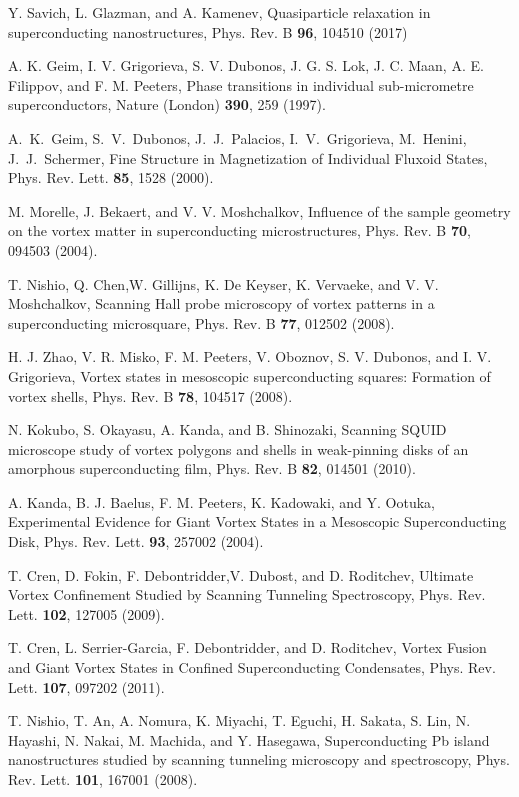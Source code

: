 \documentclass[prx,twocolumn,aps,superscriptaddress,showpacs,amsmath,amssymb,footnoteinbib]{revtex4-1}
\begin{document}
\begin{thebibliography}{99}
Y. Savich, L. Glazman, and A. Kamenev, Quasiparticle relaxation in
superconducting nanostructures, Phys. Rev. B \textbf{96}, 104510
(2017)

 A. K. Geim, I. V. Grigorieva, S. V. Dubonos, J. G. S. Lok,
J. C. Maan, A. E. Filippov, and F. M. Peeters, Phase transitions
in individual sub-micrometre superconductors, Nature (London) {\bf
390}, 259 (1997).

 A.\ K.\ Geim, S.\ V.\ Dubonos, J.\ J.\ Palacios, I.\ V.\ Grigorieva, M.\ Henini, J.\ J.\ Schermer,
Fine Structure in Magnetization of Individual Fluxoid States,
Phys. Rev. Lett. {\bf 85}, 1528 (2000).

M. Morelle, J. Bekaert, and V. V. Moshchalkov, Influence of the
sample geometry on the vortex matter in superconducting
microstructures, Phys. Rev. B {\bf 70}, 094503 (2004).

T. Nishio, Q. Chen,W. Gillijns, K. De Keyser, K. Vervaeke, and V.
V. Moshchalkov, Scanning Hall probe microscopy of vortex patterns
in a superconducting microsquare, Phys. Rev. B {\bf 77}, 012502
(2008).

H. J. Zhao, V. R. Misko, F. M. Peeters, V. Oboznov, S. V. Dubonos,
and I. V. Grigorieva, Vortex states in mesoscopic superconducting
squares: Formation of vortex shells, Phys. Rev. B {\bf 78}, 104517
(2008).

N. Kokubo, S. Okayasu, A. Kanda, and B. Shinozaki, Scanning SQUID
microscope study of vortex polygons and shells in weak-pinning
disks of an amorphous superconducting film, Phys. Rev. B {\bf 82},
014501 (2010).

 A. Kanda, B. J. Baelus, F. M. Peeters, K. Kadowaki, and Y. Ootuka,
Experimental Evidence for Giant Vortex States in a Mesoscopic
Superconducting Disk, Phys. Rev. Lett. {\bf 93}, 257002 (2004).

T. Cren, D. Fokin, F. Debontridder,V. Dubost, and D. Roditchev,
Ultimate Vortex Confinement Studied by Scanning Tunneling
Spectroscopy, Phys. Rev. Lett. {\bf 102}, 127005 (2009).

T. Cren, L. Serrier-Garcia, F. Debontridder, and D. Roditchev,
Vortex Fusion and Giant Vortex States in Confined Superconducting
Condensates, Phys. Rev. Lett. {\bf 107}, 097202 (2011).

T. Nishio, T. An, A. Nomura, K. Miyachi, T. Eguchi, H. Sakata, S.
Lin, N. Hayashi, N. Nakai, M. Machida, and Y. Hasegawa,
Superconducting Pb island nanostructures studied by scanning
tunneling microscopy and spectroscopy, Phys. Rev. Lett. {\bf 101},
167001 (2008).


\end{thebibliography}
\end{document}
